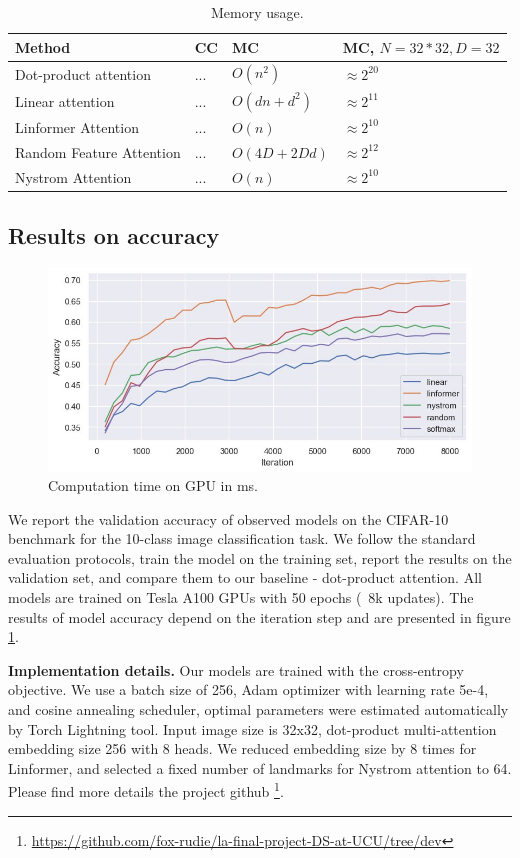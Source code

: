 \begin{table}
\centering
\begin{tabular}{l|l|l|l}
Method & CC & MC & MC, $N=32*32, D=32$ \\\hline
Dot-product attention & ... & $ O(n^2) $ & $\approx 2^{20}$ \\
Linear attention & ... & $ O(dn+d^2) $ & $\approx 2^{11}$ \\
Linformer Attention & ... & $ O(n) $ & $ \approx 2^{10} $ \\
Random Feature Attention & ... & $O(4D + 2Dd)$ & $\approx 2^{12}$ \\
Nystrom Attention & ... & $O(n)$ & $\approx 2^{10}$
\end{tabular}
\caption{\label{tab:mem-complexity}Memory usage.}
\end{table}


\subsection{Results on accuracy}

\begin{figure}[!h]
	\centering
	\includegraphics[scale=0.5]{attention-accuracy.jpg}
	\caption{Computation time on GPU in ms.}
	\label{fig:attention-accuracy}
\end{figure}

We report the validation accuracy of observed models on the CIFAR-10 \cite{cifar-10}  benchmark for the 10-class image classification task. We follow the standard evaluation protocols, train the model on the training set, report the results on the validation set, and compare them to our baseline - dot-product attention. All models are trained on Tesla A100 GPUs with 50 epochs (~8k updates). The results of model accuracy depend on the iteration step and are presented in figure \ref{fig:attention-accuracy}.

\textbf{Implementation details.} Our models are trained with the cross-entropy objective. We use a batch size of 256, Adam optimizer with learning rate 5e-4, and cosine annealing scheduler, optimal parameters were estimated automatically by Torch Lightning tool. Input image size is 32x32, dot-product multi-attention embedding size 256 with 8 heads. We reduced embedding size by 8 times for Linformer, and selected a fixed number of landmarks for Nystrom attention to 64.
 Please find more details the project github \footnote{\url{https://github.com/fox-rudie/la-final-project-DS-at-UCU/tree/dev}}.



